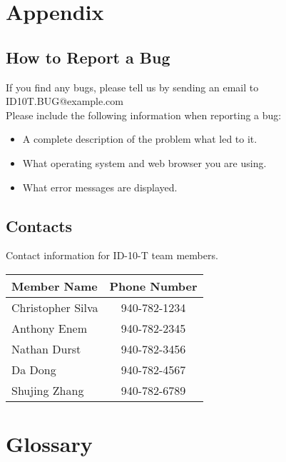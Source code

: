 \documentclass{scrreprt}
\begin{document}
	{\let\clearpage\relax \chapter{Appendix}}
	
	\section{How to Report a Bug}
	If you find any bugs, please tell us by sending an email to ID10T.BUG@example.com\\
	Please include the following information when reporting a bug:\\
	\begin{itemize}
		\item A complete description of the problem what led to it.
		\item What operating system and web browser you are using.
		\item What error messages are displayed.
	\end{itemize}
	
	\section{Contacts}
		Contact information for ID-10-T team members.\\
		\begin{tabular}{|l|c|}
			\hline
			Member Name       & Phone Number \\ \hline
			Christopher Silva & 940-782-1234 \\ \hline
			Anthony Enem      & 940-782-2345 \\ \hline
			Nathan Durst      & 940-782-3456 \\ \hline
			Da Dong           & 940-782-4567 \\ \hline
			Shujing Zhang     & 940-782-6789 \\ \hline
		\end{tabular}
	
	{\let\clearpage\relax \chapter{Glossary}}
\end{document}
